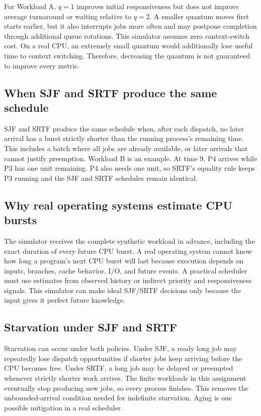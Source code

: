 \documentclass[11pt,a4paper]{article}
\begin{document}
For Workload A, $q=1$ improves initial responsiveness but does not improve average
turnaround or waiting relative to $q=2$. A smaller quantum moves first starts
earlier, but it also interrupts jobs more often and may postpone completion through
additional queue rotations. This simulator assumes zero context-switch cost. On a
real CPU, an extremely small quantum would additionally lose useful time to context
switching. Therefore, decreasing the quantum is not guaranteed to improve every
metric.

\subsection{When SJF and SRTF produce the same schedule}

SJF and SRTF produce the same schedule when, after each dispatch, no later arrival
has a burst strictly shorter than the running process's remaining time. This includes
a batch where all jobs are already available, or later arrivals that cannot justify
preemption. Workload B is an example. At time 9, P4 arrives while P3 has one unit
remaining. P4 also needs one unit, so SRTF's equality rule keeps P3 running and the
SJF and SRTF schedules remain identical.

\subsection{Why real operating systems estimate CPU bursts}

The simulator receives the complete synthetic workload in advance, including the
exact duration of every future CPU burst. A real operating system cannot know how
long a program's next CPU burst will last because execution depends on inputs,
branches, cache behavior, I/O, and future events. A practical scheduler must use
estimates from observed history or indirect priority and responsiveness signals.
This simulator can make ideal SJF/SRTF decisions only because the input gives it
perfect future knowledge.

\subsection{Starvation under SJF and SRTF}

Starvation can occur under both policies. Under SJF, a ready long job may repeatedly
lose dispatch opportunities if shorter jobs keep arriving before the CPU becomes
free. Under SRTF, a long job may be delayed or preempted whenever strictly shorter
work arrives. The finite workloads in this assignment eventually stop producing
new jobs, so every process finishes. This removes the unbounded-arrival condition
needed for indefinite starvation. Aging is one possible mitigation in a real
scheduler.
\end{document}

